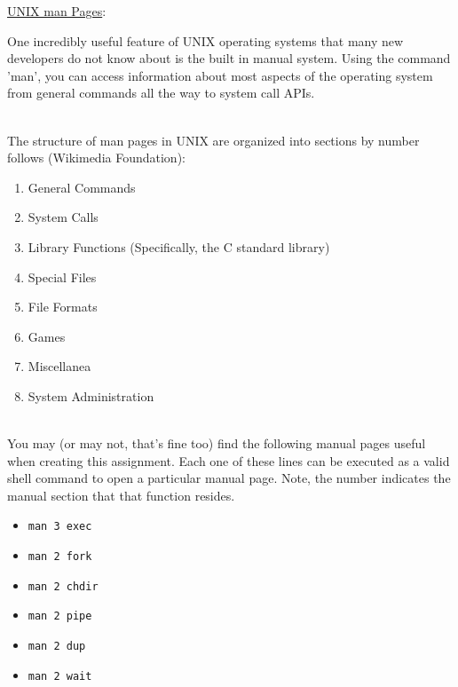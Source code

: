 \documentclass[12pt]{extarticle}
\newenvironment{myindentpar}[1]%
 {\begin{list}{}%
         {\setlength{\leftmargin}{#1}}%
         \item[]%
 }
 {\end{list}}
\newcommand{\code}[1]{\colorbox{codegray}{\texttt{#1}}}
\begin{document}
\newpage
\noindent
{\large \underline{UNIX man Pages}:}

\begin{myindentpar}{5mm}

    One incredibly useful feature of UNIX operating systems that many new developers do not know about is the built in manual system.  Using the command 'man', you can access information about most aspects of the operating system from general commands all the way to system call APIs.  
    
    \ \\
    The structure of man pages in UNIX are organized into sections by number follows (Wikimedia Foundation):
    \begin{enumerate}
        \setlength\itemsep{-0.1em}
        
        \item General Commands
        \item System Calls
        \item Library Functions (Specifically, the C standard library)
        \item Special Files
        \item File Formats
        \item Games
        \item Miscellanea
        \item System Administration
        
    \end{enumerate}
    
    \ \\
    You may (or may not, that's fine too) find the following manual pages useful when creating this assignment.  Each one of these lines can be executed as a valid shell command to open a particular manual page.  Note, the number indicates the manual section that that function resides.  
    
    \begin{itemize}
        \setlength\itemsep{-0.1em}
    
        \item \code{man 3 exec}
        \item \code{man 2 fork}
        \item \code{man 2 chdir}
        \item \code{man 2 pipe}
        \item \code{man 2 dup}
        \item \code{man 2 wait}
     
    \end{itemize}

\end{myindentpar}
\end{document}
